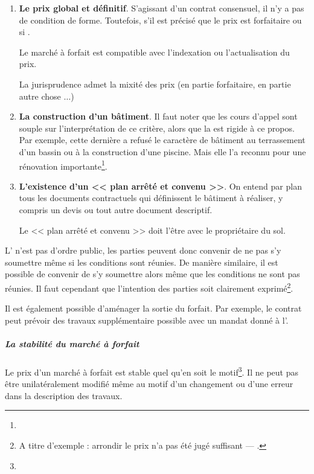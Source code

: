 					\begin{enumerate}
						\item \textbf{Le prix global et définitif}. S'agissant d'un contrat consensuel, il n'y a pas de condition de forme. Toutefois, s'il est précisé que le prix est forfaitaire ou si \lips.

						Le marché à forfait est compatible avec l'indexation ou l'actualisation du prix.

						La jurisprudence admet la mixité des prix (en partie forfaitaire, en partie autre chose $\dots$)

						\item \textbf{La construction d'un bâtiment}. Il faut noter que les cours d'appel sont souple sur l'interprétation de ce critère, alors que la \CourDeCas est rigide à ce propos.	Par exemple, cette dernière a refusé le caractère de bâtiment au terrassement d'un bassin ou à la construction d'une piscine. Mais elle l'a reconnu pour une rénovation importante\footnote{}.

						\item \textbf{L'existence d'un << plan arrêté et convenu >>}. On entend par plan tous les documents contractuels qui définissent le bâtiment à réaliser, y compris un devis ou tout autre document descriptif.

						Le << plan arrêté et convenu >> doit l'être avec le propriétaire du sol.
					\end{enumerate}

					L' n'est pas d'ordre public, les parties peuvent donc convenir de ne pas s'y soumettre même si les conditions sont réunies. De manière similaire, il est possible de convenir de s'y soumettre alors même que les conditions ne sont pas réunies. Il faut cependant que l'intention des parties soit clairement exprimé\footnote{A titre d'exemple : arrondir le prix n'a pas été jugé suffisant --- .}.

					Il est également possible d'aménager la sortie du forfait. Par exemple, le contrat peut prévoir des travaux supplémentaire possible avec un mandat donné à l'\archi.

					\subparagraph{La stabilité du marché à forfait\\}

					Le prix d'un marché à forfait est stable quel qu'en soit le motif\footnote{}. Il ne peut pas être unilatéralement modifié même au motif d'un changement ou d'une erreur dans la description des travaux.

